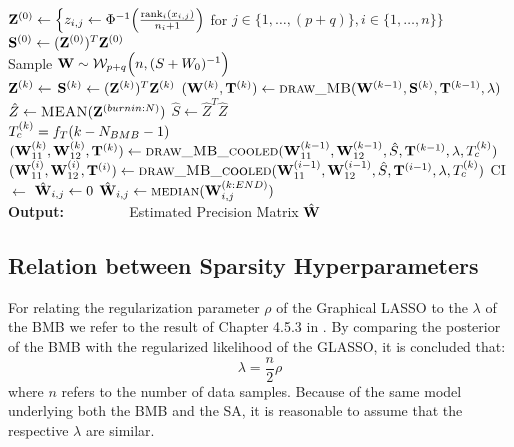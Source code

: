 \begin{algorithm}[H]
{\begin{algorithmic}
			\\
			\quad\quad\quad\quad\quad
			$\mathbf{Z}^{(0)} \gets 
			\Big\{
			{z}_{i,j} \gets \Phi^{-1}
			\Big(\frac{\text{rank}_i(x_{i,j})}{n_i+1} \Big)$ for $j\in \{1,\dots,(p+q)\}, i \in \{1,\dots,n\}
			\Big\}$
			\\
			\quad\quad\quad\quad\quad
			$\mathbf{S}^{(0)} \gets (\mathbf{Z}^{(0)})^T \mathbf{Z}^{(0)} $
			\\
			\quad\quad\quad\quad\quad
			Sample $\mathbf{W} \sim \mathcal{W}_{p+q}\Big(n, (S+W_0)^{-1}\Big) $
			\\
			\State
			$\mathbf{Z}^{(k)} \gets$ 
			\State
			$ \mathbf{S}^{(k)} \gets (\mathbf{Z}^{(k)})^T\mathbf{Z}^{(k)} $
			\State $(\W^{(k)}, \matr{T}^{(k)}) \gets \Call{draw\_MB}{\W^{(k-1)}, \matr{S}^{(k)}, \matr{T}^{(k-1)}, \lambda}$
			\EndFor
			\\
			\State $\hat{Z} \gets \Call{MEAN}{\matr{Z}^{(burnin:N)}}$
			\State $\hat{S} \gets \hat{Z}^T \hat{Z}$
			\\
			\State $T_{c}^{(k)} = f_T(k-N_{BMB}-1)$
			\State $(\Wxx^{(k)}, \Wxy^{(k)}, \matr{T}^{(k)}) \gets \Call{draw\_MB\_cooled}{\Wxx^{(k-1)}, \Wxy^{(k-1)}, \hat{S}, \matr{T}^{(k-1)}, \lambda, \Tc^{(k)}}$
			\EndFor
			\\
			\State $(\Wxx^{(i)}, \Wxy^{(i)}, \matr{T}^{(i)}) \gets \Call{draw\_MB\_cooled}{\Wxx^{(i-1)}, \Wxy^{(i-1)}, \hat{S}, \matr{T}^{(i-1)}, \lambda, \Tc^{(k)}}$
			\EndFor
			\State
			\State
			CI $\gets$ 
			\State
			$\hat{\mathbf{W}}_{i,j} \gets 0$
			\Else
			\State
			$\hat{\W}_{i,j} \gets \Call{median}{\W_{i,j}^{(k:END)}}$
			\EndIf
			\EndFor
			\\
			\State
			\textbf{Output:}
			\State $\qquad\qquad $ Estimated Precision Matrix $\hat{\mathbf{W}}$
		\end{algorithmic}}
	\end{algorithm}

\subsection{Relation between Sparsity Hyperparameters}
For relating the regularization parameter $\rho$ of the Graphical LASSO to the $\lambda$ of the \gls{BMB} we refer to the result of Chapter 4.5.3 in \citet{kaufmann2017semi}.
By comparing the posterior of the \gls{BMB} with the regularized likelihood of the GLASSO, it is concluded that:
$$\lambda = \frac{n}{2}\rho$$
where $n$ refers to the number of data samples.
Because of the same model underlying both the \gls{BMB} and the \gls{SA}, it is reasonable to assume that the respective $\lambda$ are similar.
